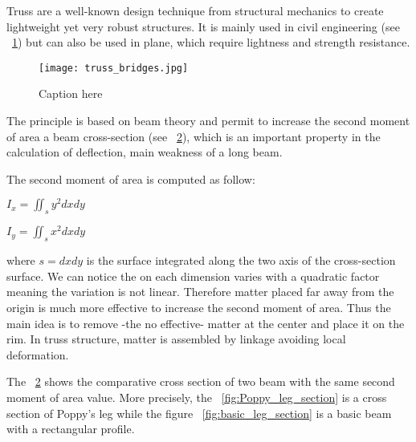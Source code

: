 Truss are a well-known design technique from structural mechanics to create lightweight yet very robust structures. It is mainly used in civil engineering (see \figurename~\ref{fig:truss_bridges}) but can also be used in plane, which require lightness and strength resistance.

\begin{figure}[tb]
    \begin{center}
        \texttt{[image: truss\_bridges.jpg]}
    \end{center}
    \caption{Caption here}
    \label{fig:truss_bridges}
\end{figure}

The principle is based on beam theory and permit to increase the second moment of area a beam cross-section (see \figurename~\ref{fig:leg_section}), which is an important property in the calculation of deflection, main weakness of a long beam.

The second moment of area is computed as follow:

\begin{center}
    $I_x = \iint_s y^2 dxdy$

    $I_y = \iint_s x^2 dxdy$
\end{center}

where $s = dxdy$ is the surface integrated along the two axis of the cross-section surface. We can notice the  on each dimension varies with a quadratic factor meaning the variation is not linear. Therefore matter placed far away from the origin is much more effective to increase the second moment of area.
Thus the main idea is to remove -the no effective- matter at the center and place it on the rim. In truss structure, matter is assembled by linkage avoiding local deformation.

The \figurename~\ref{fig:leg_section} shows the comparative cross section of two beam with the same second moment of area value. More precisely, the \figurename~\ref{fig:Poppy_leg_section} is a cross section of Poppy's leg while the figure \figurename~\ref{fig:basic_leg_section} is a basic beam with a rectangular profile.

\begin{figure}[!h]
\centering
    \hfil
    \caption{}
    \label{fig:leg_section}
\end{figure}

